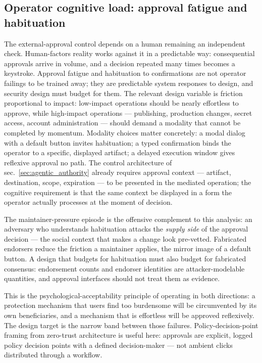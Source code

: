 \documentclass[
  english,
  9pt,
]{extarticle}
\begin{document}
\subsection{Operator cognitive load: approval fatigue and
habituation}\label{operator-cognitive-load-approval-fatigue-and-habituation}

The external-approval control depends on a human remaining an
independent check. Human-factors reality works against it in a
predictable way: consequential approvals arrive in volume, and a
decision repeated many times becomes a keystroke. Approval fatigue and
habituation to confirmations are not operator failings to be trained
away; they are predictable system responses to design, and security
design must budget for them. The relevant design variable is friction
proportional to impact: low-impact operations should be nearly
effortless to approve, while high-impact operations --- publishing,
production changes, secret access, account administration --- should
demand a modality that cannot be completed by momentum. Modality choices
matter concretely: a modal dialog with a default button invites
habituation; a typed confirmation binds the operator to a specific,
displayed artifact; a delayed execution window gives reflexive approval
no path. The control architecture of sec.~\ref{sec:agentic_authority}
already requires approval context --- artifact, destination, scope,
expiration --- to be presented in the mediated operation; the cognitive
requirement is that the same context be displayed in a form the operator
actually processes at the moment of decision.

The maintainer-pressure episode is the offensive complement to this
analysis: an adversary who understands habituation attacks the
\emph{supply side} of the approval decision --- the social context that
makes a change look pre-vetted. Fabricated endorsers reduce the friction
a maintainer applies, the mirror image of a default button. A design
that budgets for habituation must also budget for fabricated consensus:
endorsement counts and endorser identities are attacker-modelable
quantities, and approval interfaces should not treat them as evidence.

This is the psychological-acceptability principle of \citep{saltzer1975}
operating in both directions: a protection mechanism that users find too
burdensome will be circumvented by its own beneficiaries, and a
mechanism that is effortless will be approved reflexively. The design
target is the narrow band between those failures. Policy-decision-point
framing from zero-trust architecture \citep{nist_sp800_207} is useful
here: approvals are explicit, logged policy decision points with a
defined decision-maker --- not ambient clicks distributed through a
workflow.
\end{document}
